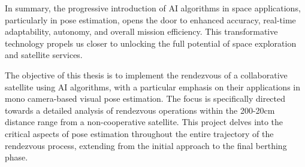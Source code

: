 In summary, the progressive introduction of AI algorithms in space applications, particularly in pose estimation, opens the door to enhanced accuracy, real-time adaptability, autonomy, and overall mission efficiency. This transformative technology propels us closer to unlocking the full potential of space exploration and satellite services.

The objective of this thesis is to implement the rendezvous of a collaborative satellite using AI algorithms, with a particular emphasis on their applications in mono camera-based visual pose estimation. The focus is specifically directed towards a detailed analysis of rendezvous operations within the 200-20cm distance range from a non-cooperative satellite. This project delves into the critical aspects of pose estimation throughout the entire trajectory of the rendezvous process, extending from the initial approach to the final berthing phase.
